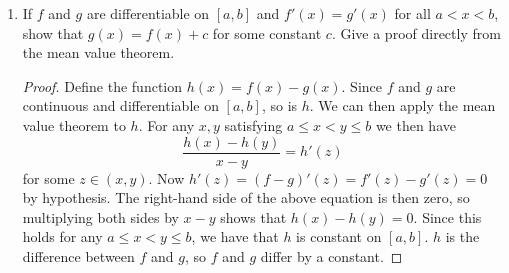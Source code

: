 \documentclass[12pt]{article}
\begin{document}
\begin{enumerate}
	\item If $f$ and $g$ are differentiable on $[a,b]$ and $f'(x) = g'(x)$ for all $a<x<b$, show that $g(x) = f(x)+c$ for some constant $c$. Give a proof directly from the mean value theorem.
	\begin{proof}
		Define the function $h(x)= f(x)-g(x)$. Since $f$ and $g$ are continuous and differentiable on $[a,b]$, so is $h$. We can then apply the mean value theorem to $h$. For any $x,y$ satisfying $a\leq x<y\leq b$ we then have
		\[
		\frac{h(x)-h(y)}{x-y} = h'(z)
		\]
		for some $z\in (x,y)$. Now $h'(z) = (f-g)'(z) = f'(z)-g'(z) = 0$ by hypothesis. The right-hand side of the above equation is then zero, so multiplying both sides by $x-y$ shows that $h(x)-h(y) = 0$. Since this holds for any $a\leq x<y\leq b$, we have that $h$ is constant on $[a,b]$. $h$ is the difference between $f$ and $g$, so $f$ and $g$ differ by a constant.
	\end{proof}
	\vfill
\end{enumerate}

\end{document}
